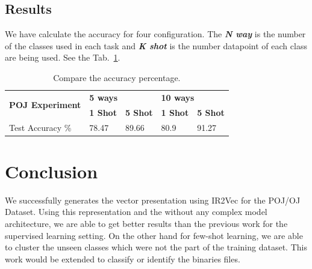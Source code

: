 \subsection{Results}
We have calculate the accuracy for four configuration. The \textit{\textbf{N way}} is the number of the classes used in each task and \textit{\textbf{K shot}} is the number datapoint  of each class are being used. See the Tab.~\ref{tab:unsupervised-acc}.
\begin{table}[h]
\begin{tabular}{lllll}
\hline
\multirow{2}{*}{\textbf{POJ Experiment}} & \multicolumn{2}{l}{\textbf{5 ways}} & \multicolumn{2}{l}{\textbf{10 ways}} \\
 & \textbf{1 Shot} & \textbf{5 Shot} & \textbf{1 Shot} & \textbf{5 Shot} \\
\hline
Test Accuracy \% & 78.47 & 89.66 & 80.9 & 91.27 \\
\hline
\end{tabular}
\centering
\caption{Compare the accuracy percentage.}
\label{tab:unsupervised-acc}
\end{table}



\section{Conclusion}\label{sec:algo:conclusion}
We successfully generates the vector presentation using IR2Vec for the POJ/OJ Dataset. Using this representation and the without any complex model architecture, we are able to get better results than the previous work for the supervised learning setting. On the other hand for few-shot learning, we are  able to cluster the unseen classes which were not the part of the training dataset.
This work would be extended to classify or identify the binaries files.